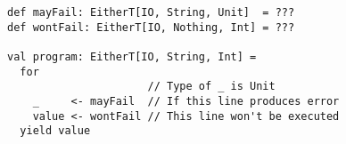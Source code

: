 \begin{algorithm}

\begin{verbatim}
def mayFail: EitherT[IO, String, Unit]  = ???
def wontFail: EitherT[IO, Nothing, Int] = ???

val program: EitherT[IO, String, Int] =
  for
                      // Type of _ is Unit
    _     <- mayFail  // If this line produces error
    value <- wontFail // This line won't be executed
  yield value
\end{verbatim}

\caption{Usage of EitherT monad transformer with IO monad%
\label{monadtransformer:either-t-io}}
\end{algorithm}